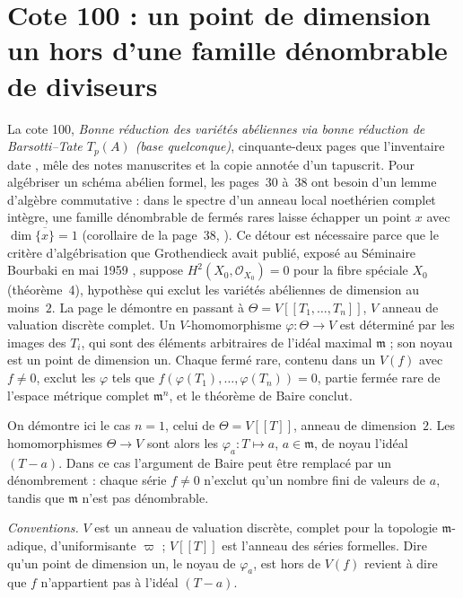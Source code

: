 \section[Cote 100 : un point de dimension un hors d'une famille dénombrable de diviseurs]{Cote 100 : un point de dimension un hors d'une famille dénombrable de diviseurs\protect{}}\label{sec:100}

La cote 100, \emph{Bonne réduction des variétés abéliennes via bonne réduction de Barsotti--Tate $T_p(A)$ (base quelconque)}, cinquante-deux pages que l'inventaire date \q{[à partir de 1967-1968]}, mêle des notes manuscrites et la copie annotée d'un tapuscrit. Pour algébriser un schéma abélien formel, les pages~30 à~38 ont besoin d'un lemme d'algèbre commutative : dans le spectre d'un anneau local noethérien complet intègre, une famille dénombrable de fermés rares laisse échapper un point $x$ avec $\dim \overline{\{x\}} = 1$ (corollaire de la page~38, ). Ce détour est nécessaire parce que le critère d'algébrisation que Grothendieck avait publié, exposé au Séminaire Bourbaki en mai 1959 \cite{sb182}, suppose $H^2(X_0, \mathcal O_{X_0}) = 0$ pour la fibre spéciale $X_0$ (théorème~4), hypothèse qui exclut les variétés abéliennes de dimension au moins~$2$. La page le démontre en passant à $\Theta = V[[T_1, \ldots, T_n]]$, $V$ anneau de valuation discrète complet. Un $V$-homomorphisme $\varphi : \Theta \to V$ est déterminé par les images des $T_i$, qui sont des éléments arbitraires de l'idéal maximal $\mathfrak m$ ; son noyau est un point de dimension un. Chaque fermé rare, contenu dans un $V(f)$ avec $f \neq 0$, exclut les $\varphi$ tels que $f(\varphi(T_1), \ldots, \varphi(T_n)) = 0$, partie fermée rare de l'espace métrique complet $\mathfrak m^n$, et le théorème de Baire conclut.

On démontre ici le cas $n = 1$, celui de $\Theta = V[[T]]$, anneau de dimension~$2$. Les homomorphismes $\Theta \to V$ sont alors les $\varphi_a : T \mapsto a$, $a \in \mathfrak m$, de noyau l'idéal $(T - a)$. Dans ce cas l'argument de Baire peut être remplacé par un dénombrement : chaque série $f \neq 0$ n'exclut qu'un nombre fini de valeurs de $a$, tandis que $\mathfrak m$ n'est pas dénombrable.

\noindent\emph{Conventions.} $V$ est un anneau de valuation discrète, complet pour la topologie $\mathfrak m$-adique, d'uniformisante $\varpi$ ; $V[[T]]$ est l'anneau des séries formelles. Dire qu'un point de dimension un, le noyau de $\varphi_a$, est hors de $V(f)$ revient à dire que $f$ n'appartient pas à l'idéal $(T - a)$.


